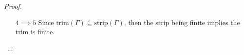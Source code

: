 \documentclass[12pt]{article}
\newcommand{\Comments}{1}
\newcommand{\mynote}[2]{\ifnum\Comments=1\textcolor{#1}{#2}\fi}
\newcommand{\jessie}[1]{\mynote{purple}{[JF: #1]}}
\newcommand{\R}{\mathcal{R}}
\newcommand{\inter}[1]{\mathring{#1}}%
\newcommand{\trim}{\mathrm{trim}}
\newcommand{\strip}{\mathrm{strip}}
\begin{document}
\begin{proof}
\begin{enumerate}
\item [$4 \implies 5$]
Since $\trim(\Gamma) \subseteq \strip(\Gamma)$, then the strip being finite implies the trim is finite.


%
%
%
%
%
%
\end{enumerate} 

\end{proof}
\end{document}
